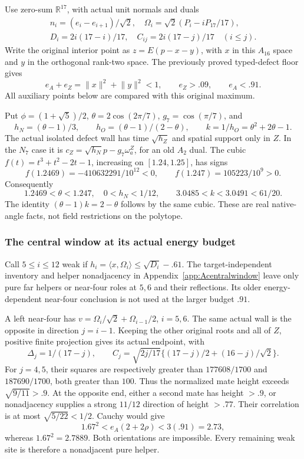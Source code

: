 \documentclass[11pt]{article}
\theoremstyle{definition}
\theoremstyle{remark}
\newcommand{\ip}[2]{\langle #1,#2\rangle}
\newcommand{\norm}[1]{\lVert #1\rVert}
\begin{document}
Use zero-sum \(\mathbb R^{17}\), with actual unit normals and duals
\[
\begin{gathered}
 n_i=(e_i-e_{i+1})/\sqrt2,\quad
 \Omega_i=\sqrt2(P_i-iP_{17}/17),\\
 D_i=2i(17-i)/17,\quad C_{ij}=2i(17-j)/17\quad(i\le j).
\end{gathered}
\]
Write the original interior point as \(z=E(p-x-y)\), with
\(x\) in this \(A_{16}\) space and \(y\) in the orthogonal
rank-two space.  The previously proved typed-defect floor gives
\[
 e_A+e_Z=\norm x^2+\norm y^2<1,\qquad e_Z>.09,
 \qquad e_A<.91.                                      \tag{T1}
\]
All auxiliary points below are compared with this original maximum.

Put \(\phi=(1+\sqrt5)/2\), \(\theta=2\cos(2\pi/7)\),
\(g_7=\cos(\pi/7)\), and
\[
 h_N=(\theta-1)/3,\qquad h_O=(\theta-1)/(2-\theta),
 \qquad k=1/h_O=\theta^2+2\theta-1.
\]
The actual isolated defect wall has time \(\sqrt{h_Z}\) and
spatial support only in \(Z\).  In the \(N_7\) case it is
\(c_Z=\sqrt{h_N}p-g_7\omega_a^Z\), for an old \(A_2\) dual.
The cubic \(f(t)=t^3+t^2-2t-1\), increasing on \([1.24,1.25]\),
has signs
\[
 f(1.2469)=-410632291/10^{12}<0,\qquad
 f(1.247)=105223/10^9>0.
\]
Consequently
\[
 1.2469<\theta<1.247,\quad 0<h_N<1/12,\qquad
 3.0485<k<3.0491<61/20.                              \tag{T2}
\]
The identity \((\theta-1)k=2-\theta\) follows by the same cubic.
These are real native-angle facts, not field restrictions on the polytope.

\subsubsection{The central window at its actual energy budget}
Call \(5\le i\le12\) weak if
\(h_i=\ip{x}{\Omega_i}\le\sqrt{D_i}-.61\).
The target-independent inventory and helper nonadjacency in
Appendix~\ref{app:Acentralwindow} leave only pure far helpers or
near-four roles at \(5,6\) and their reflections.
Its older energy-dependent near-four conclusion is not used at the
larger budget \(.91\).

A left near-four has
\(v=\Omega_i/\sqrt2+\Omega_{i-1}/2\), \(i=5,6\).
The same actual wall is the opposite in direction \(j=i-1\).
Keeping the other original roots and all of \(Z\), positive finite
projection gives its actual endpoint, with
\[
 \Delta_j=1/(17-j),\qquad
 C_j=\sqrt{2j/17}\{(17-j)/2+(16-j)/\sqrt2\}.
\]
For \(j=4,5\), their squares are respectively greater than
\(177608/1700\) and \(187690/1700\), both greater than \(100\).
Thus the normalized mate height exceeds \(\sqrt{9/11}>.9\).
At the opposite end, either a second mate has height \(>.9\), or
nonadjacency supplies a strong \(11/12\) direction of height \(>.77\).
Their correlation is at most \(\sqrt{5/22}<1/2\).
Cauchy would give
\[
 1.67^2<e_A(2+2\rho)<3(.91)=2.73,
\]
whereas \(1.67^2=2.7889\).  Both orientations are impossible.
Every remaining weak site is therefore a nonadjacent pure helper.
\end{document}
